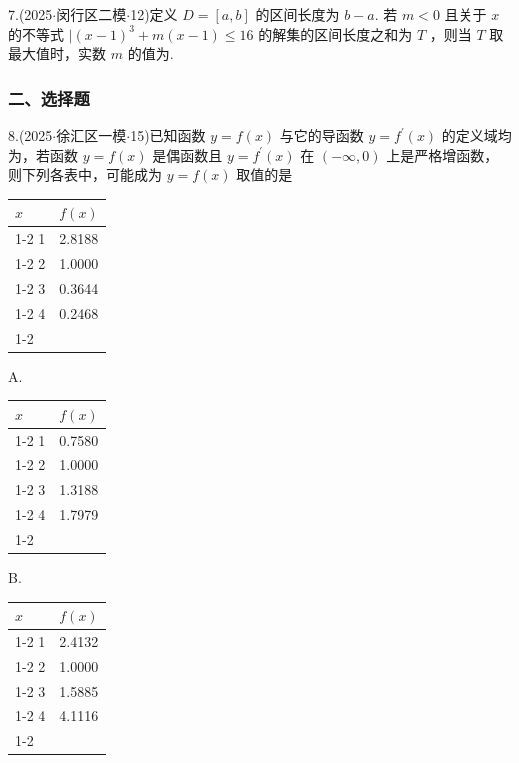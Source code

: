 7.(2025$\cdot$闵行区二模$\cdot$12)定义 $D = \left\lbrack  {a,b}\right\rbrack$ 的区间长度为 $b - a$. 若 $m < 0$ 且关于 $x$ 的不等式 $\mid  {\left( x - 1\right) }^{3} +  m\left( {x - 1}\right)  \leq  {16}$ 的解集的区间长度之和为 $T$ ，则当 $T$ 取最大值时，实数 $m$ 的值为\blkda[2]{}.

\subsubsection*{二、选择题}

8.(2025$\cdot$徐汇区一模$\cdot$15)已知函数 $y = f\left( x\right)$ 与它的导函数 $y = {f}^{\prime }\left( x\right)$ 的定义域均为\blkda[2]{}，若函数 $y = f\left( x\right)$ 是偶函数且 $y = {f}^{\prime }\left( x\right)$ 在 $\left( {-\infty ,0}\right)$ 上是严格增函数，则下列各表中，可能成为 $y = f\left( x\right)$ 取值的是\dotfill{(\kh{})}

\begin{center}

\begin{tabular}{|p{4cm}|p{12cm}|}
\hline
$x$ & $f\left( x\right)$ \\
\cline{1-2}
1 & 2.8188 \\
\cline{1-2}
2 & 1.0000 \\
\cline{1-2}
3 & 0.3644 \\
\cline{1-2}
4 & 0.2468 \\
\cline{1-2}
\hline
\end{tabular}
\end{center}

A.

\begin{center}

\begin{tabular}{|p{4cm}|p{12cm}|}
\hline
$x$ & $f\left( x\right)$ \\
\cline{1-2}
1 & 0.7580 \\
\cline{1-2}
2 & 1.0000 \\
\cline{1-2}
3 & 1.3188 \\
\cline{1-2}
4 & 1.7979 \\
\cline{1-2}
\hline
\end{tabular}
\end{center}

B.

\begin{center}

\begin{tabular}{|p{4cm}|p{12cm}|}
\hline
$x$ & $f\left( x\right)$ \\
\cline{1-2}
1 & 2.4132 \\
\cline{1-2}
2 & 1.0000 \\
\cline{1-2}
3 & 1.5885 \\
\cline{1-2}
4 & 4.1116 \\
\cline{1-2}
\hline
\end{tabular}
\end{center}

